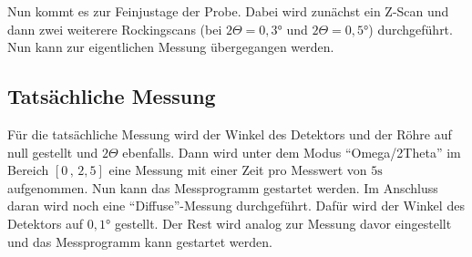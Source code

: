 Nun kommt es zur Feinjustage der Probe.
Dabei wird zunächst ein Z-Scan und dann zwei weiterere Rockingscans (bei $2 \Theta = 0,3°$ und $2 \Theta = 0,5°$) durchgeführt.
Nun kann zur eigentlichen Messung übergegangen werden.

\subsection{Tatsächliche Messung}
Für die tatsächliche Messung wird der Winkel des Detektors und der Röhre auf null gestellt und $2 \Theta$ ebenfalls.
Dann wird unter dem Modus \enquote{Omega/2Theta} im Bereich $[0 \, , \, 2,5]$ eine Messung mit einer Zeit pro Messwert von $5 \unit\second$ aufgenommen.
Nun kann das Messprogramm gestartet werden.
Im Anschluss daran wird noch eine \enquote{Diffuse}-Messung durchgeführt.
Dafür wird der Winkel des Detektors auf $0,1°$ gestellt.
Der Rest wird analog zur Messung davor eingestellt und das Messprogramm kann gestartet werden.